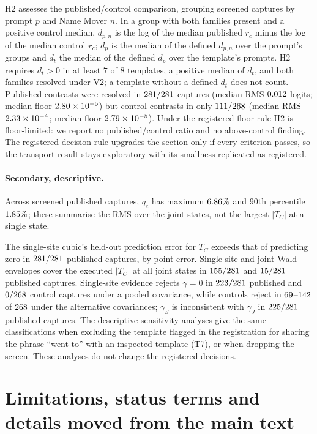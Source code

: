 H2 assesses the published/control comparison, grouping screened captures by prompt $p$ and Name Mover $n$. In a group with both families present and a positive
control median, $d_{p,n}$ is the log of the median published $r_c$ minus the log of the median control $r_c$; $d_p$ is
the median of the defined $d_{p,n}$ over the prompt's groups and $d_t$ the median of the defined $d_p$ over the
template's prompts. H2 requires $d_t>0$ in at least $7$ of $8$ templates, a positive median of $d_t$, and both
families resolved under V2; a template without a defined $d_t$ does not count. Published contrasts were resolved in $281/281$
captures (median RMS $0.012$ logits; median floor $2.80\times10^{-5}$) but control contrasts in only $111/268$
(median RMS $2.33\times10^{-4}$; median floor $2.79\times10^{-5}$). Under the registered floor rule H2 is floor-limited: we
report no published/control ratio and no above-control finding. The registered decision rule upgrades the section
only if every criterion passes, so the transport result stays exploratory with its smallness replicated as
registered.

\paragraph{Secondary, descriptive.} Across screened published captures, $q_c$ has maximum $6.86\%$ and 90th
percentile $1.85\%$; these summarise the RMS over the joint states, not the largest $|T_C|$ at a single
state.

The single-site cubic's held-out prediction error for $T_C$ exceeds that of predicting zero in
$281/281$ published captures, by point error. Single-site and joint Wald envelopes cover the executed $|T_C|$ at all joint states
in $155/281$ and $15/281$ published captures. Single-site evidence rejects $\gamma=0$ in $223/281$ published
and $0/268$ control captures under a pooled covariance, while controls reject in $69$--$142$ of
$268$ under the alternative covariances; $\gamma_S$ is inconsistent with $\gamma_J$ in $225/281$ published
captures. The descriptive sensitivity analyses give the same classifications when excluding the template flagged in the registration
for sharing the phrase ``went to'' with an inspected template (T7), or when dropping the screen. These analyses do not
change the registered decisions.

\section{Limitations, status terms and details moved from the main text}
\label{app:limits}

